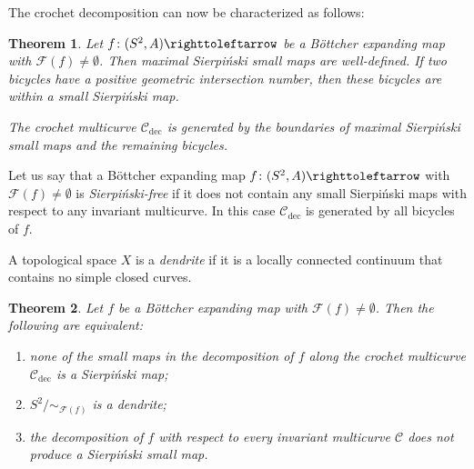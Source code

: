 \documentclass{amsart}
\newtheorem{maintheorem}{Theorem}
\theoremstyle{plain}
\theoremstyle{definition}
\theoremstyle{remark}
\renewcommand{\phi}{\varphi}
\newcommand{\Fat}{{\mathcal F}}
\newcommand{\Jul}{{\mathcal J}}
\newcommand{\JC}{{\mathcal J}}
\newcommand{\CC}{{\mathcal C}}
\newcommand\selfmap{\righttoleftarrow}
\newcommand{\cro}{{\operatorname{dec}}}
\begin{document}
  
The crochet decomposition can now be characterized as follows:
  
\begin{maintheorem}
\label{thm:Sierp bicycle}
Let $f\colon(S^2,A)\selfmap$ be a B\"ottcher expanding map with $\Fat(f)\not=\emptyset$. Then maximal Sierpi\'{n}ski small maps are well-defined. If two bicycles have a positive geometric intersection number, then these bicycles are within a small Sierpi\'{n}ski map.   

The crochet multicurve $\CC_\cro$ is generated by the boundaries of maximal Sierpi\'{n}ski small maps and the remaining bicycles. 
\end{maintheorem}  


Let us say that a B\"ottcher expanding map $f\colon (S^2,A)\selfmap$ with $\Fat(f)\not=\emptyset$ is \emph{Sierpi\'{n}ski-free} if it does not contain any small Sierpi\'{n}ski maps with respect to any invariant multicurve. In this case $\CC_\cro$ is generated by all bicycles of $f$. 


A topological space $X$ is a \emph{dendrite} if it is a locally connected continuum that contains no simple closed curves.

\begin{maintheorem}\label{thm: sierp-free-intro}
Let $f$ be a B\"ottcher expanding map with $\Fat(f)\not=\emptyset$. %
Then the following are equivalent:
\begin{enumerate}[label=\text{(\roman*)},font=\normalfont,leftmargin=*]
\item none of the small maps in the decomposition of $f$ along the crochet multicurve $\CC_\cro$ is a Sierpi\'{n}ski map;
\item $S^2/{\sim_{\Fat(f)}}$ is a dendrite;
\item the decomposition of $f$ with respect to every invariant multicurve $\CC$ does not produce a Sierpi\'{n}ski small map.
\end{enumerate}
\end{maintheorem}
 
\end{document}
